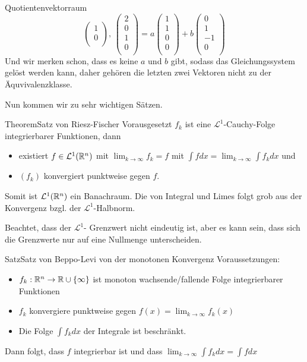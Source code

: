 \begin{Beispiel}{Quotientenvektorraum}
$$\begin{pmatrix}
        1 \\
        0 \\
    \end{pmatrix} \mbox{,     } \begin{pmatrix}
        2 \\
        0 \\
        1 \\
        0 \\
    \end{pmatrix}=a \begin{pmatrix}
        1 \\
        1 \\
        0 \\
        0 \\
    \end{pmatrix}+b\begin{pmatrix}
        0 \\
        1 \\
        -1 \\
        0 \\
    \end{pmatrix}$$
    Und wir merken schon, dass es keine $a$ und $b$ gibt, sodass das Gleichungssystem gelöst werden kann, daher gehören die letzten zwei Vektoren nicht zu der Äquvivalenzklasse.
\end{Beispiel}
Nun kommen wir zu sehr wichtigen Sätzen.
\begin{Satz}{Theorem}{Satz von Riesz-Fischer}
    Vorausgesetzt $f_k$ ist eine $\mathcal{L}^1$-Cauchy-Folge integrierbarer Funktionen, dann \begin{itemize}
        \item existiert $f\in \mathcal{L}^1(\mathbb{R}^n)$ mit $\lim_{k\rightarrow \infty}f_k = f$ mit $\int f dx = \lim_{k\rightarrow \infty}\int f_k dx$ und
        \item $(f_k)$ konvergiert punktweise gegen $f$.
    \end{itemize}
    Somit ist $\mathcal{L}^1(\mathbb{R}^n)$ ein Banachraum. Die  von Integral und Limes folgt grob aus der Konvergenz bzgl. der $\mathcal{L}^1$-Halbnorm.
\end{Satz}
Beachtet, dass der $\mathcal{L}^1$- Grenzwert nicht eindeutig ist, aber es kann sein, dass sich die Grenzwerte nur auf eine Nullmenge unterscheiden.
\begin{Satz}{Satz}{Satz von Beppo-Levi von der monotonen Konvergenz}
    Voraussetzungen:
    \begin{itemize}
        \item $f_k:\mathbb{R}^n\rightarrow \mathbb{R} \cup \{ \infty\}$ ist monoton wachsende/fallende Folge integrierbarer Funktionen
        \item $f_k$ konvergiere punktweise gegen $f(x)=\lim_{k\rightarrow \infty} f_k(x)$
        \item Die Folge $\int f_k dx$ der Integrale ist beschränkt.
    \end{itemize}
    Dann folgt, dass $f$ integrierbar ist und dass $\lim_{k\rightarrow \infty} \int f_k dx=\int f dx$
\end{Satz}
